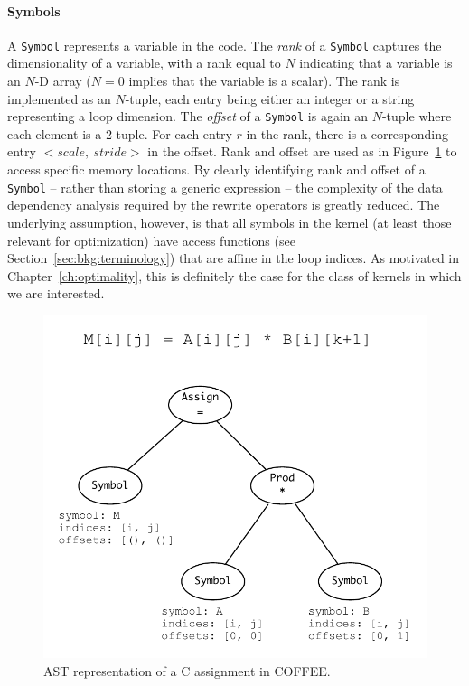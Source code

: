 \paragraph{Symbols}
A \texttt{Symbol} represents a variable in the code. The \textit{rank} of a \texttt{Symbol} captures the dimensionality of a variable, with a rank equal to $N$ indicating that a variable is an $N$-D array ($N=0$ implies that the variable is a scalar). The rank is implemented as an $N$-tuple, each entry being either an integer or a string representing a loop dimension. The \textit{offset} of a \texttt{Symbol} is again an $N$-tuple where each element is a 2-tuple. For each entry $r$ in the rank, there is a corresponding entry ${<}scale,\ stride{>}$ in the offset. Rank and offset are used as in Figure~\ref{fig:coffee-ast-vs-c} to access specific memory locations. By clearly identifying rank and offset of a \texttt{Symbol} -- rather than storing a generic expression -- the complexity of the data dependency analysis required by the rewrite operators is greatly reduced. The underlying assumption, however, is that all symbols in the kernel (at least those relevant for optimization) have access functions (see Section~\ref{sec:bkg:terminology}) that are affine in the loop indices. As motivated in Chapter~\ref{ch:optimality}, this is definitely the case for the class of kernels in which we are interested.

\begin{figure}
\begin{center}
\includegraphics[scale=0.50]{coffee/pictures/coffee-ast.pdf}
\caption{AST representation of a C assignment in COFFEE.}
\label{fig:coffee-ast-vs-c}
\end{center}
\end{figure}

